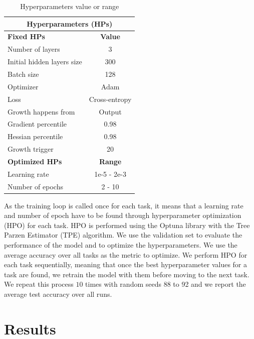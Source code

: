 \documentclass[11pt]{article}
\begin{document}
\begin{table}[h!]
    \centering
    \begin{tabular}{|l|c|}
    \hline
    \multicolumn{2}{|c|}{\textbf{Hyperparameters (HPs)}} \\
    \hline
    \textbf{Fixed HPs} & \textbf{Value}\\
    \hline
    Number of layers & 3 \\
    Initial hidden layers size & 300 \\
    Batch size & 128 \\
    Optimizer & Adam \\
    Loss & Cross-entropy \\
    Growth happens from & Output \\
    Gradient percentile & 0.98 \\
    Hessian percentile & 0.98 \\
    Growth trigger & 20\\
    \hline
    \hline
    \textbf{Optimized HPs} & \textbf{Range}\\
    \hline
    Learning rate & 1e-5 - 2e-3 \\
    Number of epochs & 2 - 10 \\
    \hline
    \end{tabular}
    \caption{Hyperparameters value or range}
    \label{table:HPs}
\end{table}


As the training loop is called once for each task, it means that a learning rate and number of epoch have to be found through hyperparameter optimization (HPO) for each task. HPO is performed using the Optuna library \cite{optuna} with the Tree Parzen Estimator (TPE) algorithm. We use the validation set to evaluate the performance of the model and to optimize the hyperparameters. We use the average accuracy over all tasks as the metric to optimize. We perform HPO for each task sequentially, meaning that once the best hyperparameter values for a task are found, we retrain the model with them before moving to the next task. We repeat this process $10$ times with random seeds 88 to 92 and we report the average test accuracy over all runs.



\section{Results}
\end{document}
